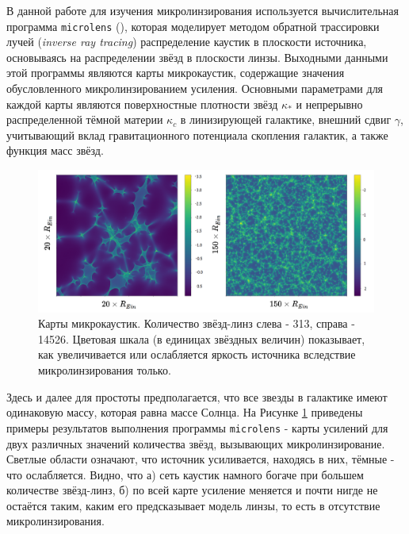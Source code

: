 В данной работе для изучения микролинзирования используется вычислительная программа {\tt{microlens}} (\cite{wambsganss1999}), которая моделирует методом обратной трассировки лучей (\textit{inverse ray tracing}) распределение каустик в плоскости источника, основываясь на распределении звёзд в плоскости линзы. Выходными данными этой программы являются карты микрокаустик, содержащие значения обусловленного микролинзированием усиления. Основными параметрами для каждой карты являются поверхностные плотности звёзд $\kappa_*$ и непрерывно распределенной тёмной материи $\kappa_c$ в линизирующей галактике, внешний сдвиг $\gamma$, учитывающий вклад гравитационного потенциала скопления галактик, а также функция масс звёзд. 

\begin{figure}[H]
    \centering
	\includegraphics[scale=0.22]{pics/maps_example.png}
	\caption{Карты микрокаустик. Количество звёзд-линз слева - 313, справа - 14526. Цветовая шкала (в единицах звёздных величин) показывает, как увеличивается или ослабляется яркость источника вследствие микролинзирования только. \label{fig:micromaps}} 
\end{figure}
Здесь и далее для простоты предполагается, что все звезды в галактике имеют одинаковую массу, которая равна массе Солнца. На Рисунке \ref{fig:micromaps} приведены примеры результатов выполнения программы {\tt{microlens}} - карты усилений для двух различных значений количества звёзд, вызывающих микролинзирование. Светлые области означают, что источник усиливается, находясь в них, тёмные - что ослабляется. Видно, что а) сеть каустик намного богаче при большем количестве звёзд-линз, б) по всей карте усиление меняется и почти нигде не остаётся таким, каким его предсказывает модель линзы, то есть в отсутствие микролинзирования.